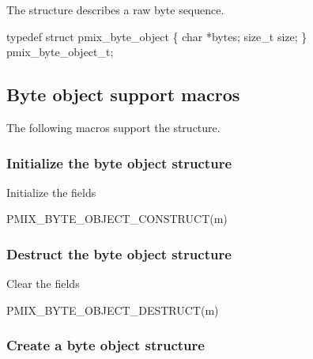 The  structure describes a raw byte sequence.

\cspecificstart
\begin{codepar}
typedef struct pmix_byte_object \{
    char *bytes;
    size_t size;
\} pmix_byte_object_t;
\end{codepar}
\cspecificend

\subsection{Byte object support macros}
The following macros support the  structure.

\subsubsection{Initialize the byte object structure}

Initialize the  fields

\cspecificstart
\begin{codepar}
PMIX_BYTE_OBJECT_CONSTRUCT(m)
\end{codepar}
\cspecificend

\begin{arglist}
\end{arglist}

\subsubsection{Destruct the byte object structure}

Clear the  fields

\cspecificstart
\begin{codepar}
PMIX_BYTE_OBJECT_DESTRUCT(m)
\end{codepar}
\cspecificend

\begin{arglist}
\end{arglist}

\subsubsection{Create a byte object structure}

